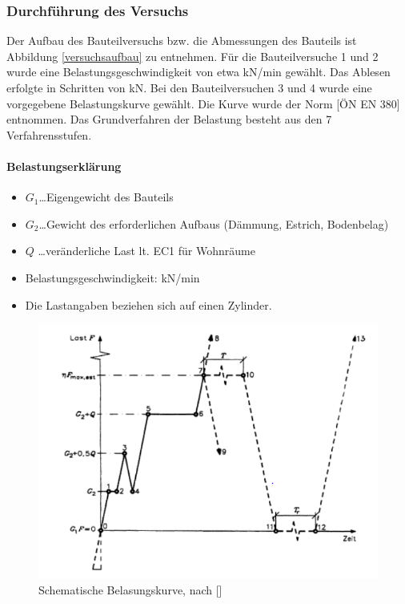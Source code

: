 	
\subsubsection{Durchführung des Versuchs}
Der Aufbau des Bauteilversuchs bzw. die Abmessungen des Bauteils ist  Abbildung \ref{versuchsaufbau} zu entnehmen. Für die Bauteilversuche 1 und 2 wurde eine Belastungsgeschwindigkeit von etwa \unit[4]{kN/min} gewählt. Das Ablesen erfolgte in Schritten von \unit[2]{kN}. Bei den Bauteilversuchen 3 und 4 wurde eine vorgegebene Belastungskurve gewählt. Die Kurve wurde der Norm [ÖN EN 380] entnommen. Das Grundverfahren der Belastung besteht aus den 7 Verfahrensstufen. 

\paragraph{Belastungserklärung}
\begin{itemize}
\item $G_{1}$\ldots Eigengewicht des Bauteils
\item $G_{2}$\ldots Gewicht des erforderlichen Aufbaus (Dämmung, Estrich, Bodenbelag)
\item $Q$ \ldots veränderliche Last lt. EC1 für Wohnräume
\item Belastungsgeschwindigkeit: \unit[1,5]{kN/min}
\item Die Lastangaben beziehen sich auf einen Zylinder.
\end{itemize}
	

\begin{figure}
\begin{center}

	\includegraphics[width=12cm]{Versuchsaufbau/belastungskurve.png}
	\caption{Schematische Belasungskurve, nach []}
	\label{belastungskurve}

\end{center}	
\end{figure}	

